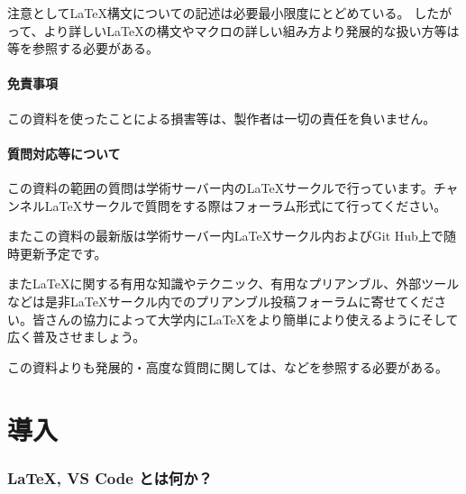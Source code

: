 \documentclass[titlepage]{ltjsarticle}
\begin{document}
注意として\LaTeX 構文についての記述は必要最小限度にとどめている。
したがって、より詳しい\LaTeX の構文やマクロの詳しい組み方より発展的な扱い方等は\cite{美文書本}\cite{一週間基礎}等を参照する必要がある。

\subsection{免責事項}

この資料を使ったことによる損害等は、製作者は一切の責任を負いません。

\subsection{質問対応等について}

この資料の範囲の質問は学術サーバー内のLaTeXサークルで行っています。チャンネルLaTeXサークルで質問をする際はフォーラム形式にて行ってください。

またこの資料の最新版は学術サーバー内LaTeXサークル内およびGit Hub上で随時更新予定です。

また\LaTeX に関する有用な知識やテクニック、有用なプリアンブル、外部ツールなどは是非LaTeXサークル内でのプリアンブル投稿フォーラムに寄せてください。皆さんの協力によって大学内に\LaTeX をより簡単により使えるようにそして広く普及させましょう。

この資料よりも発展的・高度な質問に関しては、\cite{TeXwiki-home}などを参照する必要がある。
\clearpage
\tableofcontents
\clearpage

\part{導入}
\section{\LaTeX , VS Code とは何か？}
\end{document}
